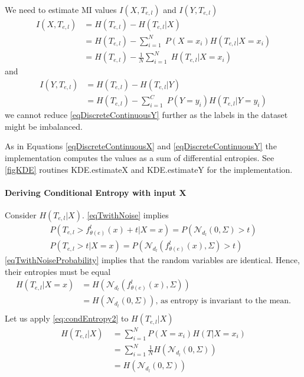 \documentclass[dissertation.tex]{subfiles}
\begin{document}
We need to estimate MI values $I(X, T_{e,l})$ and $I(Y, T_{e,l})$
\begin{align}
  I(X, T_{e,l})&=H(T_{e,l})-H(T_{e,l}|X) 
  \nonumber\\&=
  H(T_{e,l})-\sum_{i=1}^N\;P(X=x_i)H(T_{e,l}|X=x_i)
  \nonumber\\&=
  H(T_{e,l})-\frac{1}{N}\sum_{i=1}^N\;H(T_{e,l}|X=x_i)
  \label{eqDiscreteContinuousX}
\end{align}
and
\begin{align}
  I(Y, T_{e,l})&=H(T_{e,l})-H(T_{e,l}|Y) 
  \nonumber\\&=
  H(T_{e,l})-\sum_{i=1}^C\;P(Y=y_i)H(T_{e,l}|Y=y_i)
  \label{eqDiscreteContinuousY}
\end{align}
we cannot reduce \autoref{eqDiscreteContinuousY} further as the labels in
the dataset might be imbalanced.

As in Equations \ref{eqDiscreteContinuousX} and \ref{eqDiscreteContinuousY} the
implementation computes the values as a sum of differential entropies. See
\autoref{figKDE} routines KDE.estimateX and KDE.estimateY for the
implementation.

\paragraph{Deriving Conditional Entropy with input X}

Consider $H(T_{e,l}|X)$. \autoref{eqTwithNoise} implies
\begin{gather}
  P(T_{e,l} > f_{\theta(e)}^l(x) + t | X = x)
  =
  P(\mathcal{N}_{d_l}(0, \Sigma) > t)\\
  P(T_{e,l} > t | X = x)
  =
  P(\mathcal{N}_{d_l}(f_{\theta(e)}^l(x) , \Sigma) > t)
  \label{eqTwithNoiseProbability}
\end{gather}
\autoref{eqTwithNoiseProbability} implies that the random variables are
identical. Hence, their entropies must be equal
\begin{align}
  H(T_{e,l}|X=x)
  &=
  H(\mathcal{N}_{d_l}(f_{\theta(e)}^l(x), \Sigma))\\
  &=
  H(\mathcal{N}_{d_l}(0, \Sigma))
  \text{, as entropy is invariant to the mean.}
  \\
  \label{eqEqualToGaussianEntropy}
\end{align}
Let us apply \autoref{eq:condEntropy2} to $H(T_{e,l}|X)$
\begin{align}
  H(T_{e,l}|X)\ &=\sum _{i=1}^NP(X=x_i)H(T|X=x_i)\\
  &=\sum _{i=1}^N\frac{1}{N}H(\mathcal{N}_{d_l}(0, \Sigma))\\
  &=H(\mathcal{N}_{d_l}(0, \Sigma))
\end{align}
\end{document}
